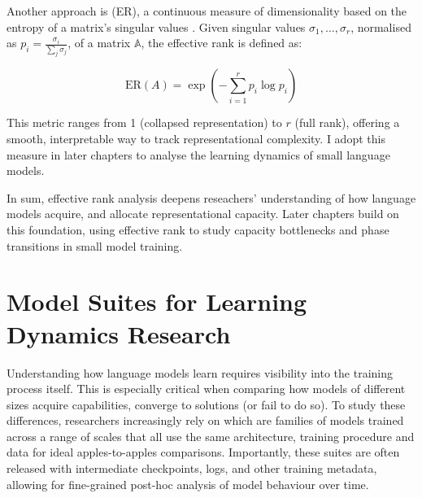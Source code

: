 Another approach is  (ER), a continuous measure of dimensionality based on the entropy of a matrix's singular values \citep{roy2007effectiverank}. Given singular values $\sigma_1, \dots, \sigma_r$, normalised as $p_i = \frac{\sigma_i}{\sum_j \sigma_j}$, of a matrix $\mathbb{A}$, the effective rank is defined as:

\[
\mathrm{ER}(A) = \exp\left(-\sum_{i=1}^r p_i \log p_i\right)
\]

This metric ranges from 1 (collapsed representation) to $r$ (full rank), offering a smooth, interpretable way to track representational complexity. I adopt this measure in later chapters to analyse the learning dynamics of small language models.



In sum, effective rank analysis deepens reseachers' understanding of how language models acquire, and allocate representational capacity. Later chapters build on this foundation, using effective rank to study capacity bottlenecks and phase transitions in small model training.

\section{Model Suites for Learning Dynamics Research}

Understanding how language models learn requires visibility into the training process itself. This is especially critical when comparing how models of different sizes acquire capabilities, converge to solutions (or fail to do so). To study these differences, researchers increasingly rely on  which are families of models trained across a range of scales that all use the same architecture, training procedure and data for ideal apples-to-apples comparisons. Importantly, these suites are often released with intermediate checkpoints, logs, and other training metadata, allowing for fine-grained post-hoc analysis of model behaviour over time.

